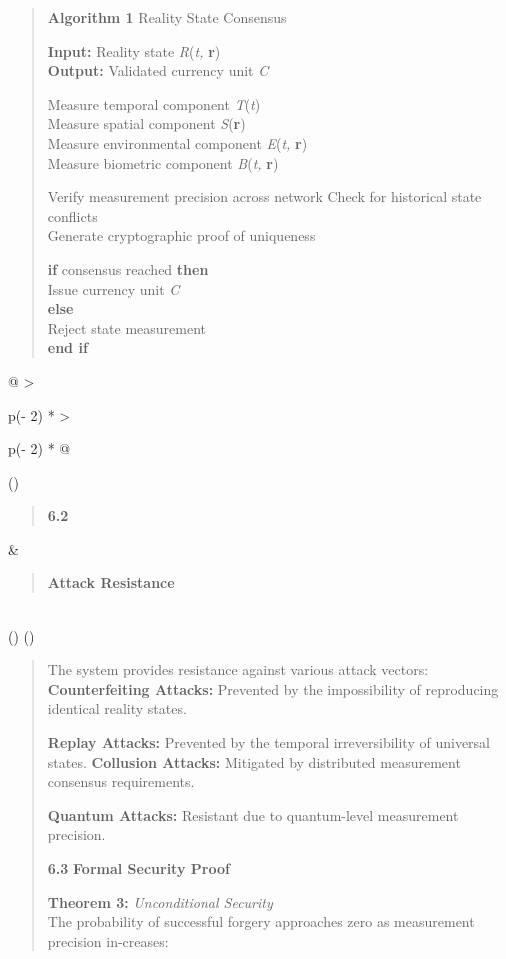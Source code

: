 \documentclass[
]{article}
\begin{document}
\begin{quote}
\textbf{Algorithm 1} Reality State Consensus

\textbf{Input:} Reality state \emph{R}(\emph{t,} \textbf{r})\\
\textbf{Output:} Validated currency unit \emph{C}

Measure temporal component \emph{T}(\emph{t})\\
Measure spatial component \emph{S}(\textbf{r})\\
Measure environmental component \emph{E}(\emph{t,} \textbf{r})\\
Measure biometric component \emph{B}(\emph{t,} \textbf{r})

Verify measurement precision across network Check for historical state
conflicts\\
Generate cryptographic proof of uniqueness

\textbf{if} consensus reached \textbf{then}\\
Issue currency unit \emph{C}\\
\textbf{else}\\
Reject state measurement\\
\textbf{end if}
\end{quote}

\begin{longtable}[]{@{}
  >{\raggedright\arraybackslash}p{(\columnwidth - 2\tabcolsep) * }
  >{\raggedright\arraybackslash}p{(\columnwidth - 2\tabcolsep) * }@{}}
\toprule()
\begin{minipage}[b]{\linewidth}\raggedright
\begin{quote}
\textbf{6.2}
\end{quote}
\end{minipage} & \begin{minipage}[b]{\linewidth}\raggedright
\begin{quote}
\textbf{Attack Resistance}
\end{quote}
\end{minipage} \\
\midrule()
\endhead
\bottomrule()
\end{longtable}

\begin{quote}
The system provides resistance against various attack vectors:\\
\textbf{Counterfeiting Attacks:} Prevented by the impossibility of
reproducing identical reality states.

\textbf{Replay Attacks:} Prevented by the temporal irreversibility of
universal states. \textbf{Collusion Attacks:} Mitigated by distributed
measurement consensus requirements.

\textbf{Quantum Attacks:} Resistant due to quantum-level measurement
precision.

\textbf{6.3} \textbf{Formal Security Proof}

\textbf{Theorem 3:} \emph{Unconditional Security}\\
The probability of successful forgery approaches zero as measurement
precision in-creases:
\end{quote}
\end{document}
